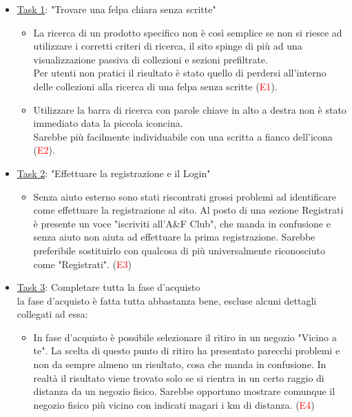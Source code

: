 \documentclass[12pt,a4paper]{report}
\begin{document}
  \begin{itemize}
    \item \underline{Task 1}: "Trovare una felpa chiara senza scritte"
    \begin{itemize}
    \item La ricerca di un prodotto specifico non è così semplice se non si riesce ad utilizzare i corretti criteri di ricerca, il sito spinge di più ad una visualizzazione passiva di collezioni e sezioni prefiltrate. \\Per utenti non pratici il risultato è stato quello di perdersi all'interno delle collezioni alla ricerca di una felpa senza scritte (\textcolor{red}{E1}).
    \item Utilizzare la barra di ricerca con parole chiave in alto a destra non è stato immediato data la piccola iconcina. \\Sarebbe più facilmente individuabile con una scritta a fianco dell'icona (\textcolor{red}{E2}).
    \end{itemize}
    \item \underline{Task 2}: "Effettuare la registrazione e il Login"
    \begin{itemize}
      \item Senza aiuto esterno sono stati riscontrati grossi problemi ad identificare come effettuare la registrazione al sito. Al posto di una sezione Registrati è presente un voce "iscriviti all'A\&F Club", che manda in confusione e senza aiuto non aiuta ad effettuare la prima registrazione. Sarebbe preferibile sostituirlo con qualcosa di più universalmente riconosciuto come "Registrati". (\textcolor{red}{E3})
    \end{itemize}
    \item \underline{Task 3}: Completare tutta la fase d’acquisto\\
    la fase d'acquisto è fatta tutta abbastanza bene, escluse alcuni dettagli collegati ad essa:
    \begin{itemize}
      \item In fase d'acquisto è possibile selezionare il ritiro in un negozio "Vicino a te". La scelta di questo punto di ritiro ha presentato parecchi problemi e non da sempre almeno un risultato, cosa che manda in confusione. In realtà il risultato viene trovato solo se si rientra in un certo raggio di distanza da un negozio fisico. Sarebbe opportuno mostrare comunque il negozio fisico più vicino con indicati magari i km di distanza. (\textcolor{red}{E4})
    \end{itemize}
  \end{itemize}
\end{document}
